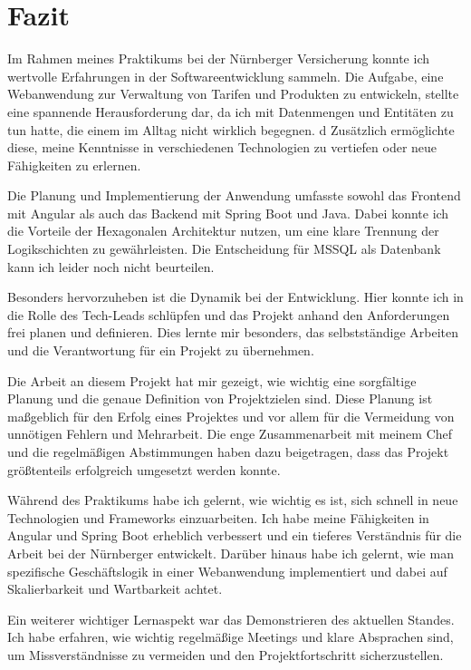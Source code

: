 \chapter{Fazit}

Im Rahmen meines Praktikums bei der Nürnberger Versicherung konnte ich wertvolle Erfahrungen in der Softwareentwicklung sammeln. 
Die Aufgabe, eine Webanwendung zur Verwaltung von Tarifen und Produkten zu entwickeln, stellte eine spannende Herausforderung dar, da ich mit Datenmengen und Entitäten zu tun hatte, die einem im Alltag nicht wirklich begegnen. d
Zusätzlich ermöglichte diese, meine Kenntnisse in verschiedenen Technologien zu vertiefen oder neue Fähigkeiten zu erlernen.

Die Planung und Implementierung der Anwendung umfasste sowohl das Frontend mit Angular als auch das Backend mit Spring Boot und Java. 
Dabei konnte ich die Vorteile der Hexagonalen Architektur nutzen, um eine klare Trennung der Logikschichten zu gewährleisten. 
Die Entscheidung für MSSQL als Datenbank kann ich leider noch nicht beurteilen.

Besonders hervorzuheben ist die Dynamik bei der Entwicklung. Hier konnte ich in die Rolle des Tech-Leads schlüpfen und das Projekt anhand den Anforderungen frei planen und definieren.
Dies lernte mir besonders, das selbstständige Arbeiten und die Verantwortung für ein Projekt zu übernehmen.

Die Arbeit an diesem Projekt hat mir gezeigt, wie wichtig eine sorgfältige Planung und die genaue Definition von Projektzielen sind.
Diese Planung ist maßgeblich für den Erfolg eines Projektes und vor allem für die Vermeidung von unnötigen Fehlern und Mehrarbeit. 
Die enge Zusammenarbeit mit meinem Chef und die regelmäßigen Abstimmungen haben dazu beigetragen, dass das Projekt größtenteils erfolgreich umgesetzt werden konnte.

Während des Praktikums habe ich gelernt, wie wichtig es ist, sich schnell in neue Technologien und Frameworks einzuarbeiten. 
Ich habe meine Fähigkeiten in Angular und Spring Boot erheblich verbessert und ein tieferes Verständnis für die Arbeit bei der Nürnberger entwickelt. 
Darüber hinaus habe ich gelernt, wie man spezifische Geschäftslogik in einer Webanwendung implementiert und dabei auf Skalierbarkeit und Wartbarkeit achtet.

Ein weiterer wichtiger Lernaspekt war das Demonstrieren des aktuellen Standes. 
Ich habe erfahren, wie wichtig regelmäßige Meetings und klare Absprachen sind, um Missverständnisse zu vermeiden und den Projektfortschritt sicherzustellen.


